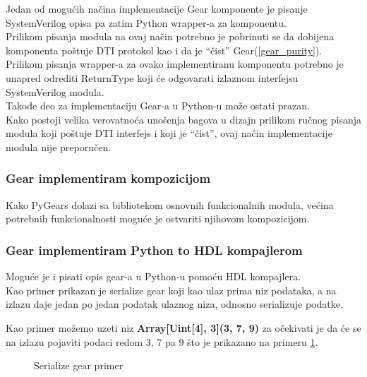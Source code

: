 Jedan od mogućih načina implementacije Gear komponente je pisanje SystemVerilog
opisa pa zatim Python wrapper-a za komponentu. \\
Prilikom pisanja modula na ovaj način potrebno je pobrinuti se da dobijena
komponenta poštuje DTI protokol kao i da je ``čist'' Gear(\ref{gear_purity}). \\

Prilikom pisanja wrapper-a za ovako implementiranu komponentu potrebno je
unapred odrediti ReturnType koji će odgovarati izlaznom interfejsu SystemVerilog modula. \\
Takođe deo za implementaciju Gear-a u Python-u može ostati prazan. \\

Kako postoji velika verovatnoća unošenja bagova u dizajn prilikom ručnog pisanja
modula koji poštuje DTI interfejs i koji je ``čist'', ovaj način implementacije
modula nije preporučen.

\subsubsection{Gear implementiram kompozicijom}

Kako PyGears dolazi sa bibliotekom osnovnih funkcionalnih modula, većina
potrebnih funkcionalnosti moguće je ostvariti njihovom kompozicijom. \\

\subsubsection{Gear implementiram Python to HDL kompajlerom}

Moguće je i pisati opis gear-a u Python-u pomoću HDL kompajlera. \\

Kao primer prikazan je serialize gear koji kao ulaz prima niz podataka, a na
izlazu daje jedan po jedan podatak ulaznog niza, odnosno serializuje podatke.



Kao primer možemo uzeti niz \textbf{Array[Uint[4], 3](3, 7, 9)} za očekivati je da će se
na izlazu pojaviti podaci redom 3, 7 pa 9 što je prikazano na primeru \ref{serialize_example2}.
\begin{figure}[H]
\centering{
  \scalebox{1.2}{
    
  }}
\caption{Serialize gear primer}
\label{serialize_example2}
\end{figure}

